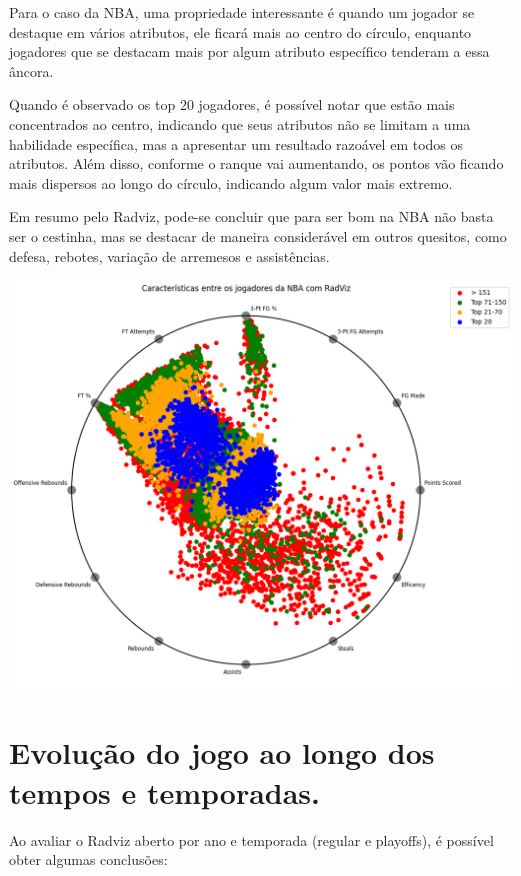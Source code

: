 \documentclass[
]{book}
\begin{document}
Para o caso da NBA, uma propriedade interessante é quando um jogador se destaque em vários atributos, ele ficará mais ao centro do círculo, enquanto jogadores que se destacam mais por algum atributo específico tenderam a essa âncora.

Quando é observado os top 20 jogadores, é possível notar que estão mais concentrados ao centro, indicando que seus atributos não se limitam a uma habilidade específica, mas a apresentar um resultado razoável em todos os atributos. Além disso, conforme o ranque vai aumentando, os pontos vão ficando mais dispersos ao longo do círculo, indicando algum valor mais extremo.

Em resumo pelo Radviz, pode-se concluir que para ser bom na NBA não basta ser o cestinha, mas se destacar de maneira considerável em outros quesitos, como defesa, rebotes, variação de arremesos e assistências.

\includegraphics{imagens/download.png}

\hypertarget{evoluuxe7uxe3o-do-jogo-ao-longo-dos-tempos-e-temporadas.}{%
\chapter{Evolução do jogo ao longo dos tempos e temporadas.}\label{evoluuxe7uxe3o-do-jogo-ao-longo-dos-tempos-e-temporadas.}}

Ao avaliar o Radviz aberto por ano e temporada (regular e playoffs), é possível obter algumas conclusões:
\end{document}
